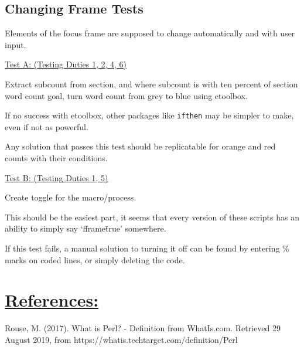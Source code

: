 \documentclass[12pt]{article}
\begin{document}
\vspace{2em}
\subsection*{Changing Frame Tests}

Elements of the focus frame are supposed to change automatically and with user input.

\underline{Test A: (Testing Duties 1, 2, 4, 6)}

Extract subcount from section, and where subcount is with ten percent of section word count goal, turn word count from grey to blue using etoolbox.

If no success with etoolbox, other packages like \texttt{ifthen} may be simpler to make, even if not as powerful.

Any solution that passes this test should be replicatable for orange and red counts with their conditions.

\vspace{1em}
\underline{Test B: (Testing Duties 1, 5)}

Create toggle for the macro/process.

This should be the easiest part, it seems that every version of these scripts has an ability to simply say `fframe\=true' somewhere.

If this test fails, a manual solution to turning it off can be found by entering \% marks on coded lines, or simply deleting the code.




\vspace{3em}
\section*{\underline{\textbf{\Large References:}}}

Rouse, M. (2017). What is Perl? - Definition from WhatIs.com. Retrieved 29 August 2019, from https://whatis.techtarget.com/definition/Perl
\end{document}
